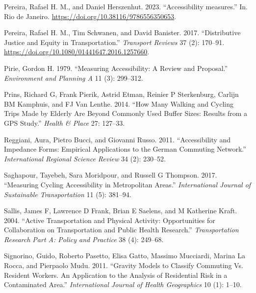 \documentclass[preprint, 3p,
authoryear]{elsarticle} %
\newlength{\cslhangindent}
\newlength{\cslentryspacingunit} %
\newenvironment{CSLReferences}[2] %
 {%
  \setlength{\parindent}{0pt}
  \ifodd #1
  \let\oldpar\par
  \def\par{\hangindent=\cslhangindent\oldpar}
  \fi
  \setlength{\parskip}{#2\cslentryspacingunit}
 }%
 {}
\begin{document}
\begin{CSLReferences}{1}{0}
\leavevmode{}%
Pereira, Rafael H. M., and Daniel Herszenhut. 2023. {``Accessibility
measures.''} In. Rio de Janeiro.
\url{https://doi.org/10.38116/9786556350653}.

\leavevmode{}%
Pereira, Rafael H. M., Tim Schwanen, and David Banister. 2017.
{``Distributive Justice and Equity in Transportation.''} \emph{Transport
Reviews} 37 (2): 170--91.
\url{https://doi.org/10.1080/01441647.2016.1257660}.

\leavevmode{}%
Pirie, Gordon H. 1979. {``Measuring Accessibility: A Review and
Proposal.''} \emph{Environment and Planning A} 11 (3): 299--312.

\leavevmode{}%
Prins, Richard G, Frank Pierik, Astrid Etman, Reinier P Sterkenburg,
Carlijn BM Kamphuis, and FJ Van Lenthe. 2014. {``How Many Walking and
Cycling Trips Made by Elderly Are Beyond Commonly Used Buffer Sizes:
Results from a GPS Study.''} \emph{Health \& Place} 27: 127--33.

\leavevmode{}%
Reggiani, Aura, Pietro Bucci, and Giovanni Russo. 2011. {``Accessibility
and Impedance Forms: Empirical Applications to the German Commuting
Network.''} \emph{International Regional Science Review} 34 (2):
230--52.

\leavevmode{}%
Saghapour, Tayebeh, Sara Moridpour, and Russell G Thompson. 2017.
{``Measuring Cycling Accessibility in Metropolitan Areas.''}
\emph{International Journal of Sustainable Transportation} 11 (5):
381--94.

\leavevmode{}%
Sallis, James F, Lawrence D Frank, Brian E Saelens, and M Katherine
Kraft. 2004. {``Active Transportation and Physical Activity:
Opportunities for Collaboration on Transportation and Public Health
Research.''} \emph{Transportation Research Part A: Policy and Practice}
38 (4): 249--68.

\leavevmode{}%
Signorino, Guido, Roberto Pasetto, Elisa Gatto, Massimo Mucciardi,
Marina La Rocca, and Pierpaolo Mudu. 2011. {``Gravity Models to Classify
Commuting Vs. Resident Workers. An Application to the Analysis of
Residential Risk in a Contaminated Area.''} \emph{International Journal
of Health Geographics} 10 (1): 1--10.


\end{CSLReferences}
\end{document}
